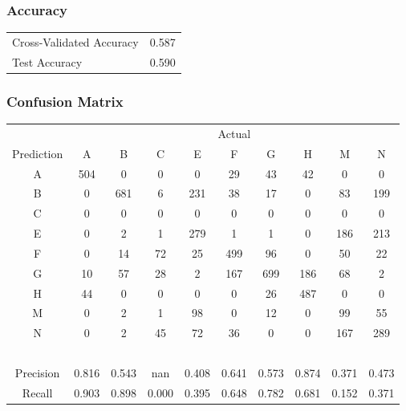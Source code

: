 \documentclass[12pt]{article}
\begin{document}
\subsubsection*{Accuracy}
	\hspace{1cm}
	\begin{tabular}{l|c}
	Cross-Validated Accuracy & 0.587 \\
	Test Accuracy & 0.590 \\
	\end{tabular}

\subsubsection*{Confusion Matrix}
\hspace{1cm}
    \begin{tabular}{c|ccccccccc}
	& \multicolumn{9}{c}{Actual} \\ 
     Prediction         & A     & B     & C     & E     & F     & G     & H     & M     & N     \\ \hline
    A         & 504   & 0     & 0     & 0     & 29    & 43    & 42    & 0     & 0     \\
    B         & 0     & 681   & 6     & 231   & 38    & 17    & 0     & 83    & 199   \\
    C         & 0     & 0     & 0     & 0     & 0     & 0     & 0     & 0     & 0     \\
    E         & 0     & 2     & 1     & 279   & 1     & 1     & 0     & 186   & 213   \\
    F         & 0     & 14    & 72    & 25    & 499   & 96    & 0     & 50    & 22    \\
    G         & 10    & 57    & 28    & 2     & 167   & 699   & 186   & 68    & 2     \\
    H         & 44    & 0     & 0     & 0     & 0     & 26    & 487   & 0     & 0     \\
    M         & 0     & 2     & 1     & 98    & 0     & 12    & 0     & 99    & 55    \\
    N         & 0     & 2     & 45    & 72    & 36    & 0     & 0     & 167   & 289   \\
    ~         & ~     & ~     & ~     & ~     & ~     & ~     & ~     & ~     & ~     \\
    Precision & 0.816 & 0.543 & nan   & 0.408 & 0.641 & 0.573 & 0.874 & 0.371 & 0.473 \\
    Recall    & 0.903 & 0.898 & 0.000 & 0.395 & 0.648 & 0.782 & 0.681 & 0.152 & 0.371 \\
    \end{tabular}
\vspace{1em}
\end{document}

